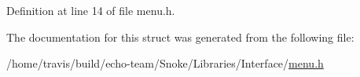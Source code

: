Definition at line 14 of file menu.\-h.



The documentation for this struct was generated from the following file\-:\begin{DoxyCompactItemize}
\item 
/home/travis/build/echo-\/team/\-Snoke/\-Libraries/\-Interface/\hyperlink{menu_8h}{menu.\-h}\end{DoxyCompactItemize}

